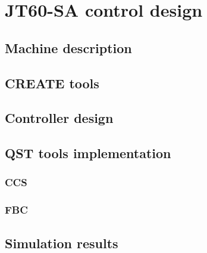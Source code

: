 \chapter{JT60-SA control design}

\section{Machine description}
\section{CREATE tools}
\section{Controller design}
\section{QST tools implementation}
\subsection{CCS}
\subsection{FBC}
\section{Simulation results}	